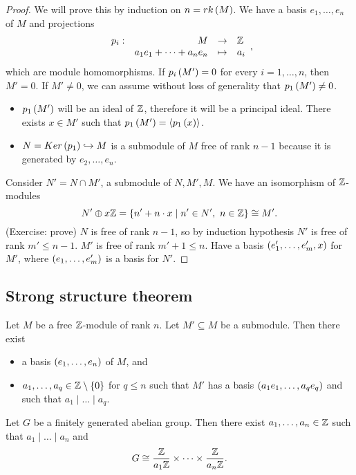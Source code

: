 \begin{proof}
We will prove this by induction on $ n = rk\left( M \right) $. We have a basis $ e_1, \dots, e_n $ of $ M $ and projections
$$ \function[p_i]{M}{\Z}{a_1e_1 + \dots + a_ne_n}{a_i}, $$
which are module homomorphisms. If $ p_i\left( M' \right) = 0 $ for every $ i = 1, \dots, n $, then $ M' = 0 $. If $ M' \ne 0 $, we can assume without loss of generality that $ p_1\left( M' \right) \ne 0 $.
\begin{itemize}
\item $ p_1\left( M' \right) $ will be an ideal of $ \mathbb{Z} $, therefore it will be a principal ideal. There exists $ x \in M' $ such that $ p_1\left( M' \right) = \left\langle p_1\left( x \right) \right\rangle $.
\item $ N = Ker\left( p_1 \right) \hookrightarrow M $ is a submodule of $ M $ free of rank $ n - 1 $ because it is generated by $ e_2, \dots, e_n $.
\end{itemize}
Consider $ N' = N \cap M' $, a submodule of $ N, M', M $. We have an isomorphism of $ \mathbb{Z} $-modules
$$ N' \oplus x\mathbb{Z} = \left\{ n' + n \cdot x \mid n' \in N', \ n \in \mathbb{Z} \right\} \cong M'. $$
(Exercise: prove) $ N $ is free of rank $ n - 1 $, so by induction hypothesis $ N' $ is free of rank $ m' \le n - 1 $. $ M' $ is free of rank $ m' + 1 \le n $. Have a basis $ \left( e_1', \dots, e_m', x \right) $ for $ M' $, where $ \left( e_1, \dots, e_m' \right) $ is a basis for $ N' $.
\end{proof}

\subsection{Strong structure theorem}

\begin{theorem}
\label{thm:structure}
Let $ M $ be a free $ \mathbb{Z} $-module of rank $ n $. Let $ M' \subseteq M $ be a submodule. Then there exist
\begin{itemize}
\item a basis $ \left( e_1, \dots, e_n \right) $ of $ M $, and
\item $ a_1, \dots, a_q \in \mathbb{Z} \setminus \left\{ 0 \right\} $ for $ q \le n $ such that $ M' $ has a basis $ \left( a_1e_1, \dots, a_qe_q \right) $ and such that $ a_1 \mid \dots \mid a_q $.
\end{itemize}
\end{theorem}

\begin{corollary}
\label{cor:structure}
Let $ G $ be a finitely generated abelian group. Then there exist $ a_1, \dots, a_n \in \mathbb{Z} $ such that $ a_1 \mid \dots \mid a_n $ and
$$ G \cong \dfrac{\mathbb{Z}}{a_1\mathbb{Z}} \times \dots \times \dfrac{\mathbb{Z}}{a_n\mathbb{Z}}. $$
\end{corollary}


